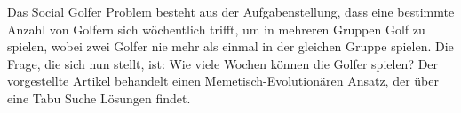 Das Social Golfer Problem besteht aus der Aufgabenstellung, dass eine bestimmte Anzahl von Golfern sich wöchentlich trifft, um in mehreren Gruppen Golf zu spielen, wobei zwei Golfer nie mehr als einmal in der gleichen Gruppe spielen.
Die Frage, die sich nun stellt, ist: Wie viele Wochen können die Golfer spielen?
Der vorgestellte Artikel behandelt einen Memetisch-Evolutionären Ansatz, der über eine Tabu Suche Lösungen findet.
